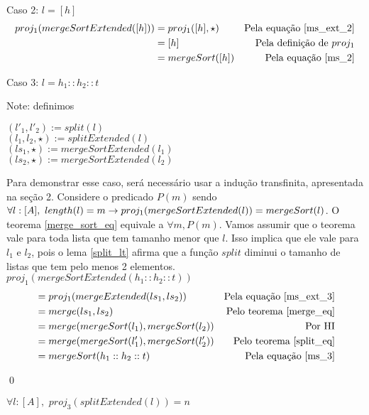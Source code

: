 \documentclass[12pt, oneside, a4paper,english,brazil]{abntex2}
\begin{document}
Caso 2:  $l = [h]$
\begin{align*}
  proj_{1}(mergeSortExtended([h])) &= proj_{1}([h], \star) &\text{Pela equa\c{c}\~ao \ref{ms_ext_2}}\\
                                      &= [h] &\text{Pela defini\c{c}\~ao de $proj_{1}$}\\
  &= mergeSort([h]) &\text{Pela equa\c{c}\~ao \ref{ms_2}}
\end{align*}

Caso 3: $l = h_{1} :: h_{2} :: t$

Note: definimos
\begin{center}
$(l'_{1}, l'_{2}) := split(l)$\\
$(l_{1}, l_{2}, \star) := splitExtended(l)$\\
$(ls_{1}, \star) := mergeSortExtended(l_{1})$\\
$(ls_{2}, \star) := mergeSortExtended(l_{2})$
\end{center}

Para demonstrar esse caso, ser\'a necess\'ario usar a indu\c{c}\~ao transfinita, apresentada na se\c{c}\~ao 2.
Considere o predicado $P(m)$ sendo $\forall l : [A], \,\, length(l) = m \rightarrow \\ proj_{1}(mergeSortExtended(l)) =
mergeSort(l)$. O teorema \ref{merge_sort_eq} equivale  a $\forall m, P(m)$. Vamos assumir que o teorema vale para toda
lista que tem tamanho menor que $l$. Isso implica que ele vale para $l_{1}$ e $l_{2}$, pois o lema \ref{split_lt} afirma
que a fun\c{c}\~ao $split$ diminui o tamanho de listas que tem pelo menos 2 elementos.\\

$proj_{1}(mergeSortExtended(h_{1} :: h_{2} :: t))$
\begin{align*}
  &= proj_{1}(mergeExtended(ls_{1}, ls_{2})) &\text{Pela equa\c{c}\~ao \ref{ms_ext_3}}\\
  &= merge(ls_{1}, ls_{2}) &\text{Pelo teorema \ref{merge_eq}}\\
  &= merge(mergeSort(l_{1}), mergeSort(l_{2})) &\text{Por HI}\\
  &= merge(mergeSort(l'_{1}), mergeSort(l'_{2})) &\text{Pelo teorema \ref{split_eq}}\\
  &= mergeSort(h_{1} :: h_{2} :: t) &\text{Pela equa\c{c}\~ao \ref{ms_3}}
\end{align*}

\qed

\begin{teorema}\label{split_time}
  $\forall l : [A], \,\, proj_{3}(splitExtended(l)) = n$
\end{teorema}
\end{document}
